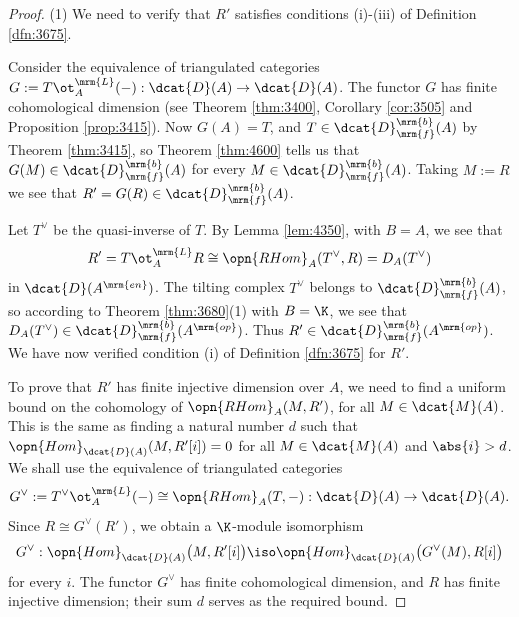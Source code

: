\begin{proof} \mbox{}

\smallskip \noindent
(1) We need to verify that $R'$ satisfies conditions (i)-(iii) of Definition 
\ref{dfn:3675}. 

Consider the equivalence of triangulated categories 
$G := T \ot^{\mrm{L}}_{A} (-) : \dcat{D}(A) \to \dcat{D}(A)$.
The functor $G$ has finite cohomological dimension (see Theorem \ref{thm:3400}, 
Corollary \ref{cor:3505} and Proposition \ref{prop:3415}). Now 
$G(A) = T$, and  
$T \in \dcat{D}^{\mrm{b}}_{\mrm{f}}(A)$
by Theorem \ref{thm:3415}, so Theorem \ref{thm:4600}
tells us that $G(M) \in \dcat{D}^{\mrm{b}}_{\mrm{f}}(A)$
for every $M \in \dcat{D}^{\mrm{b}}_{\mrm{f}}(A)$. 
Taking $M := R$ we see that 
$R' = G(R) \in \dcat{D}^{\mrm{b}}_{\mrm{f}}(A)$. 

Let $T^{\vee}$ be the quasi-inverse of $T$. By Lemma \ref{lem:4350}, with 
$B = A$, we see that 
\begin{equation} \label{eqn:4365}
R' = T \ot^{\mrm{L}}_{A} R \cong \opn{RHom}_{A}(T^{\vee}, R) = 
D_A(T^{\vee})
\end{equation}
in $\dcat{D}(A^{\mrm{en}})$. The tilting complex $T^{\vee}$ belongs to 
$\dcat{D}^{\mrm{b}}_{\mrm{f}}(A)$, so according to Theorem \ref{thm:3680}(1) 
with $B = \K$, we see that 
$D_A(T^{\vee}) \in \dcat{D}^{\mrm{b}}_{\mrm{f}}(A^{\mrm{op}})$. 
Thus $R' \in \dcat{D}^{\mrm{b}}_{\mrm{f}}(A^{\mrm{op}})$.
We have now verified condition (i) of Definition \ref{dfn:3675} for $R'$. 

To prove that $R'$ has finite injective dimension over $A$, we need to find a 
uniform bound on the cohomology of $\opn{RHom}_{A}(M, R')$, for all 
$M \in \dcat{M}(A)$. This is the same as finding a natural number $d$ such 
that $\opn{Hom}_{\dcat{D}(A)}(M, R'[i]) = 0$ for all 
$M \in \dcat{M}(A)$ and $\abs{i} > d$. 
We shall use the equivalence of triangulated categories 
\[ G^{\vee} := T^{\vee} \ot^{\mrm{L}}_{A} (-) \cong 
\opn{RHom}_{A}(T, -) : \dcat{D}(A) \to \dcat{D}(A) . \]
Since $R \cong G^{\vee}(R')$, we obtain a $\K$-module isomorphism
\[ G^{\vee} : \opn{Hom}_{\dcat{D}(A)} \bigl( M, R'[i] \bigr) \iso
\opn{Hom}_{\dcat{D}(A)} \bigl( G^{\vee}(M), R[i] \bigr)  \]
for every $i$. The functor $G^{\vee}$ has finite cohomological dimension, and 
$R$ has finite injective dimension; their sum $d$ serves as the required bound. 


\end{proof}
